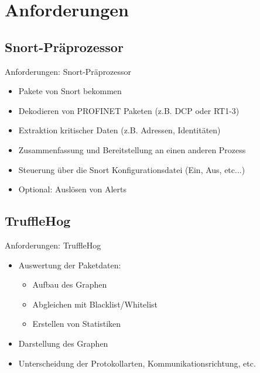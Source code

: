 \documentclass[18pt]{beamer}
\begin{document}
\section{Anforderungen}

\subsection{Snort-Präprozessor}
\begin{frame}{Anforderungen: Snort-Präprozessor}
    \begin{itemize}
      \item Pakete von Snort bekommen
      \pause
      \item Dekodieren von PROFINET Paketen (z.B. DCP oder RT1-3)
      \pause
      \item Extraktion kritischer Daten (z.B. Adressen, Identitäten)
      \pause
      \item Zusammenfassung und Bereitstellung an einen anderen Prozess
      \pause
      \item Steuerung über die Snort Konfigurationsdatei (Ein, Aus, etc...)
      \pause
      \item Optional: Auslösen von Alerts
    \end{itemize}
\end{frame}


\subsection{TruffleHog}
\begin{frame}{Anforderungen: TruffleHog}
    \begin{itemize}
      \item Auswertung der Paketdaten: \pause
      \begin{itemize}
        \item Aufbau des Graphen \pause
        \item Abgleichen mit Blacklist/Whitelist \pause
        \item Erstellen von Statistiken \pause
      \end{itemize}

      \item Darstellung des Graphen  \pause
      \item Unterscheidung der Protokollarten, Kommunikationsrichtung, etc.

    \end{itemize}
\end{frame}
\end{document}
